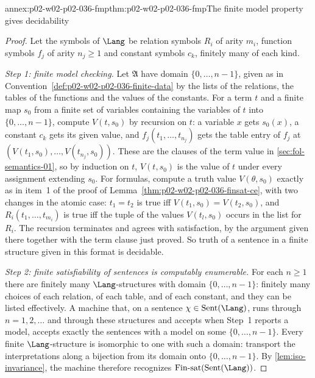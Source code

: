 \begin{annexitem}{annex:p02-w02-p02-036-fmp}{thm:p02-w02-p02-036-fmp}{The finite model property gives decidability}
\begin{proof}
Let the symbols of \(\Lang\) be relation symbols \(R_i\) of arity \(m_i\),
function symbols \(f_j\) of arity \(n_j\geq1\) and constant symbols \(c_k\),
finitely many of each kind.

\emph{Step 1: finite model checking.}  Let \(\mathfrak A\) have domain
\(\{0,\ldots,n-1\}\), given as in
Convention~\ref{def:p02-w02-p02-036-finite-data} by the lists of the
relations, the tables of the functions and the values of the constants.  For
a term \(t\) and a finite map \(s_0\) from a finite set of variables
containing the variables of \(t\) into \(\{0,\ldots,n-1\}\), compute
\(V(t,s_0)\) by recursion on \(t\): a variable \(x\) gets \(s_0(x)\), a
constant \(c_k\) gets its given value, and \(f_j(t_1,\ldots,t_{n_j})\) gets the
table entry of \(f_j\) at \((V(t_1,s_0),\ldots,V(t_{n_j},s_0))\).  These are the
clauses of the term value in \cref{sec:fol-semantics-01}, so by induction on
\(t\), \(V(t,s_0)\) is the value of \(t\) under every assignment extending
\(s_0\).  For formulas, compute a truth value \(V(\theta,s_0)\) exactly as in
item~1 of the proof of Lemma~\ref{thm:p02-w02-p02-036-finsat-ce}, with two
changes in the atomic case: \(t_1=t_2\) is true iff \(V(t_1,s_0)=V(t_2,s_0)\),
and \(R_i(t_1,\ldots,t_{m_i})\) is true iff the tuple of the values
\(V(t_l,s_0)\) occurs in the list for \(R_i\).  The recursion terminates and
agrees with satisfaction, by the argument given there together with the term
clause just proved.  So truth of a sentence in a finite structure given in
this format is decidable.

\emph{Step 2: finite satisfiability of sentences is computably enumerable.}
For each \(n\geq1\) there are finitely many \(\Lang\)-structures with domain
\(\{0,\ldots,n-1\}\): finitely many choices of each relation, of each table,
and of each constant, and they can be listed effectively.  A machine that, on
a sentence \(\chi\in\operatorname{Sent}(\Lang)\), runs through
\(n=1,2,\ldots\) and through these structures and accepts when Step~1 reports a
model, accepts exactly the sentences with a model on some
\(\{0,\ldots,n-1\}\).  Every finite \(\Lang\)-structure is isomorphic to one
with such a domain: transport the interpretations along a bijection from its
domain onto \(\{0,\ldots,n-1\}\).  By \cref{lem:iso-invariance}, the machine
therefore recognizes \(\mathrm{Fin\text{-}sat}(\operatorname{Sent}(\Lang))\).


\end{proof}
\end{annexitem}
